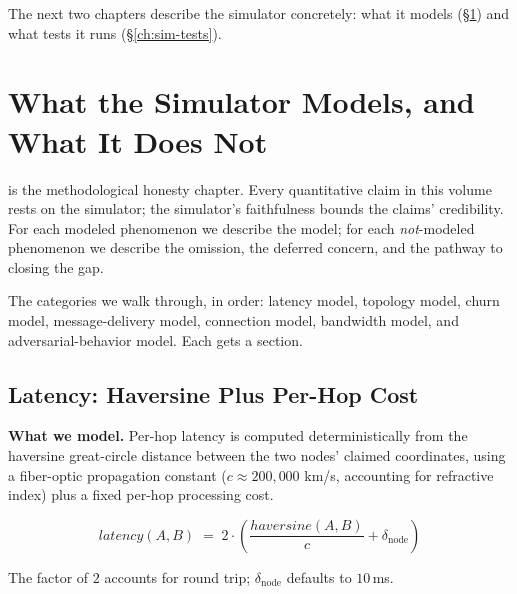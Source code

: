 \documentclass[twoside,nobib]{tufte-book}
\begin{document}
The next two chapters describe the simulator concretely: what it
models (\S\ref{ch:sim-fidelity}) and what tests it runs
(\S\ref{ch:sim-tests}).


\chapter{What the Simulator Models, and What It Does Not}
\label{ch:sim-fidelity}

 is the methodological honesty
chapter. Every quantitative claim in this volume rests on the
simulator; the simulator's faithfulness bounds the claims'
credibility. For each modeled phenomenon we describe the model;
for each \emph{not}-modeled phenomenon we describe the omission,
the deferred concern, and the pathway to closing the gap.

The categories we walk through, in order: latency model,
topology model, churn model, message-delivery model, connection
model, bandwidth model, and adversarial-behavior model. Each
gets a section.

\section{Latency: Haversine Plus Per-Hop Cost}

\textbf{What we model.} Per-hop latency is computed
deterministically from the haversine great-circle distance
between the two nodes' claimed coordinates, using a fiber-optic
propagation constant ($c \approx 200{,}000$ km/s, accounting for
refractive index) plus a fixed per-hop processing
cost.

\[
\mathit{latency}(A, B) \;=\;
2 \cdot \left( \frac{\mathit{haversine}(A, B)}{c} + \delta_{\mathrm{node}} \right)
\]

The factor of $2$ accounts for round trip; $\delta_{\mathrm{node}}$
defaults to $10$\,ms.
\end{document}
